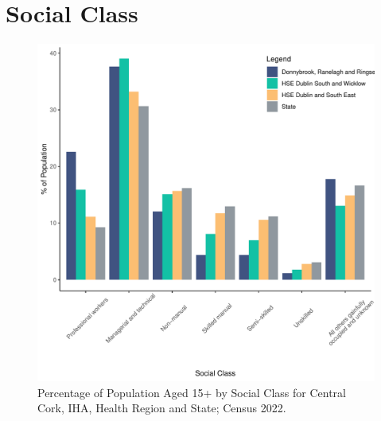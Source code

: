 \documentclass{article}
\begin{document}
\section{Social Class}\label{sect:SC}
\begin{figure}[H]
	\centering
	\includegraphics[width = 140mm]{../figures/SocialClassED.pdf}
	\caption{Percentage of Population Aged 15+ by Social Class for Central Cork, IHA, Health Region and State; Census 2022.}
	\label{fig:vbnv}
	\end{figure}
\end{document}
